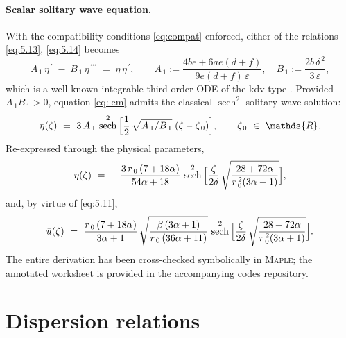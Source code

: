 \documentclass[alpha-refs, 12pt]{wiley-article}
\DeclareMathOperator{\sech}{sech}
\newcommand{\R}{\mathds{R}}
\newcommand{\eps}{\varepsilon}
\begin{document}
\paragraph{Scalar solitary wave equation.} With the compatibility conditions \eqref{eq:compat} enforced, either of the relations \eqref{eq:5.13}, \eqref{eq:5.14} becomes
\begin{equation}
  A_{\,1}\,\eta^{\,\prime}
  \;-\;
  B_{\,1}\,\eta^{\,\prime\prime\prime}
  \;=\;
  \eta\,\eta^{\,\prime},
  \qquad
  A_{\,1}:=\frac{4be+6ae(d+f)}{9e(d+f)\,\eps},
  \quad
  B_{\,1}:=\frac{2b\,\delta^{\,2}}{3\,\eps},
  \label{eq:lem}
\end{equation}
which is a well-known integrable third-order ODE of the \acrshort{kdv} type \cite{Newell1977}. Provided $A_{\,1}B_{\,1}>0$, equation \eqref{eq:lem} admits the classical $\sech^{2}$ solitary-wave solution:
\begin{equation*}
  \eta(\zeta)\ =\ 3\,A_{\,1}\,
  \sech^{2}\,\Bigl[
    \frac12\,\sqrt{A_{\,1}/B_{\,1}}\;(\zeta-\zeta_{\,0})
  \Bigr], \qquad \zeta_{\,0}\ \in\ \R.
\end{equation*}
Re-expressed through the physical parameters,
\begin{equation}
  \eta(\zeta)\ =\ -\,\frac{3\,r_{\,0}\,(7+18\alpha)}{54\alpha+18}\,
  \sech^{2}\,\Bigl[\frac{\zeta}{2\delta}\,\sqrt{\frac{28+72\alpha}{r_{\,0}^{\,2}(3\alpha+1)}}\Bigr], \label{eq:solitarybouss1}
\end{equation}
and, by virtue of \eqref{eq:5.11},
\begin{equation}
  \bar{u}(\zeta)\ =\ \frac{r_{\,0}\,(7+18\alpha)}{3\alpha+1}\,
  \sqrt{\frac{\beta\,(3\alpha+1)}{r_{\,0}\,(36\alpha+11)}}\,
  \sech^{2}\,\Bigl[\frac{\zeta}{2\delta}\,\sqrt{\frac{28+72\alpha}{r_{\,0}^{\,2}(3\alpha+1)}}\Bigr]. \label{eq:solitarybouss2}
\end{equation}
The entire derivation has been cross-checked symbolically in \textsc{Maple}; the annotated worksheet is provided in the accompanying codes repository.

\section{Dispersion relations}\label{sec:dispersion}
\end{document}
